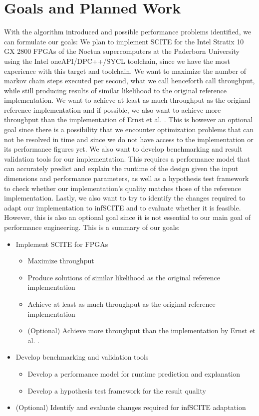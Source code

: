 \section{Goals and Planned Work}

With the algorithm introduced and possible performance problems identified, we can formulate our goals: We plan to implement \ac{SCITE} for the Intel Stratix 10 GX 2800 \acp{FPGA} of the Noctua supercomputers at the Paderborn University using the Intel oneAPI/DPC++/SYCL toolchain, since we have the most experience with this target and toolchain. We want to maximize the number of markov chain steps executed per second, what we call henceforth call throughput, while still producing results of similar likelihood to the original reference implementation. We want to achieve at least as much throughput as the original reference implementation and if possible, we also want to achieve more throughput than the implementation of Ernst et al. \cite{ernst2020Performance}. This is however an optional goal since there is a possibility that we encounter optimization problems that can not be resolved in time and since we do not have access to the implementation or its performance figures yet. We also want to develop benchmarking and result validation tools for our implementation. This requires a performance model that can accurately predict and explain the runtime of the design given the input dimensions and performance parameters, as well as a hypothesis test framework to check whether our implementation's quality matches those of the reference implementation. Lastly, we also want to try to identify the changes required to adapt our implementation to \ac{infSCITE} and to evaluate whether it is feasible. However, this is also an optional goal since it is not essential to our main goal of performance engineering. This is a summary of our goals:

\begin{itemize}
    \item Implement \ac{SCITE} for \acp{FPGA}
    \begin{itemize}
        \item Maximize throughput
        \item Produce solutions of similar likelihood as the original reference implementation
        \item Achieve at least as much throughput as the original reference implementation
        \item (Optional) Achieve more throughput than the implementation by Ernst et al. \cite{ernst2020Performance}.
    \end{itemize}
    \item Develop benchmarking and validation tools
    \begin{itemize}
        \item Develop a performance model for runtime prediction and explanation
        \item Develop a hypothesis test framework for the result quality
    \end{itemize}
    \item (Optional) Identify and evaluate changes required for \ac{infSCITE} adaptation
\end{itemize}

